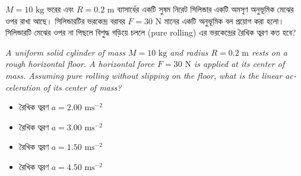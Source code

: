 \documentclass[12pt, a4paper]{article}
\begin{document}
\newpage

\begin{tcolorbox}[questionbox={প্রশ্ন (Question) 44}]
\noindent
$M = 10\text{ kg}$ ভরের এবং $R = 0.2\text{ m}$ ব্যাসার্ধের একটি সুষম নিরেট সিলিন্ডার একটি অমসৃণ অনুভূমিক মেঝের ওপর রাখা আছে। সিলিন্ডারটির ভরকেন্দ্র বরাবর $F = 30\text{ N}$ মানের একটি অনুভূমিক বল প্রয়োগ করা হলো। সিলিন্ডারটি মেঝের ওপর না পিছলে বিশুদ্ধ গড়িয়ে চললে (pure rolling) এর ভরকেন্দ্রের রৈখিক ত্বরণ কত হবে?

\vspace{0.8em}
\begin{english}
\noindent\textit{\color{darkgray}
A uniform solid cylinder of mass $M = 10\text{ kg}$ and radius $R = 0.2\text{ m}$ rests on a rough horizontal floor. A horizontal force $F = 30\text{ N}$ is applied at its center of mass. Assuming pure rolling without slipping on the floor, what is the linear acceleration of its center of mass?
}
\end{english}
\end{tcolorbox}

\vspace{1em}
\begin{center}
\end{center}
\vspace{1em}

\begin{itemize}[label={}, leftmargin=1cm, itemsep=0.5em]
\item[\textbf{A)}] রৈখিক ত্বরণ $a = 2.00\text{ ms}^{-2}$
\item[\textbf{B)}] রৈখিক ত্বরণ $a = 3.00\text{ ms}^{-2}$
\item[\textbf{C)}] রৈখিক ত্বরণ $a = 1.50\text{ ms}^{-2}$
\item[\textbf{D)}] রৈখিক ত্বরণ $a = 4.50\text{ ms}^{-2}$
\end{itemize}
\end{document}
